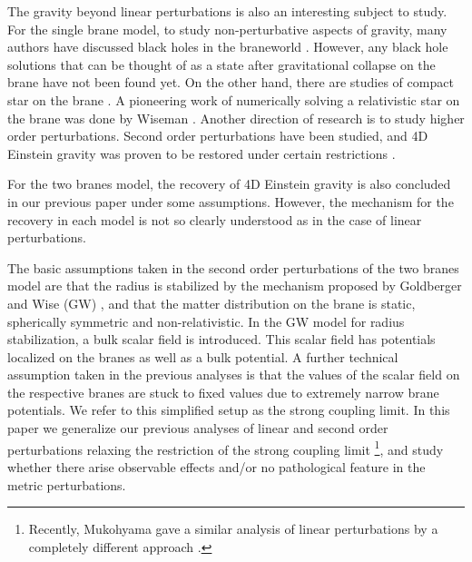 \documentclass[a4paper,showpacs,preprintnumbers,amsmath,amssymb]{revtex4}
\begin{document}
The gravity beyond linear perturbations is also an interesting subject to study. For the single brane model,
to study non-perturbative aspects of gravity, many authors have discussed black holes in the braneworld \cite{Gregory:1993vy,Chamblin:2000by,Emparan:2000wa,Dadhich:2000am,Giannakis:2001ss,Chamblin:2001ra,Bruni:2001fd,Horowitz:2001cz,Cadeau:2001tj,Vacaru:2001rf,Vacaru:2001wc,Emparan:2001wn,Kanti:2001cj,Casadio:2001jg,Tanaka:2002rb}.
However, any black hole solutions that can be thought of as a state after gravitational collapse on the brane have not been found yet. On the other hand, there are studies of compact star on the brane \cite{Germani:2001du,Deruelle:2001fb}.
A pioneering work of numerically solving a relativistic star on the brane was done by Wiseman \cite{Wiseman:2001xt}.  
Another direction of research is to study higher order perturbations. 
Second order perturbations have been studied, and 4D Einstein gravity was proven to be restored under certain restrictions \cite{Giannakis:2001zx,Kudoh:2001wb}.  


For the two branes model, the recovery of 4D Einstein gravity is also concluded in our previous paper 
\cite{Kudoh:2001kz} under some assumptions.
However, the mechanism for the recovery in each model is not so clearly understood as in the case of linear perturbations.  

The basic assumptions taken in the second order perturbations of the two branes model are that the radius is stabilized by the mechanism proposed by Goldberger and Wise (GW) \cite{Goldberger:1999uk}, and that the matter distribution on the brane is static, spherically symmetric and non-relativistic. 
In the GW model for radius stabilization, a bulk scalar field is introduced. This scalar field has potentials localized on the branes as well as a bulk potential. 
A further technical assumption taken in the previous analyses \cite{Tanaka:2000er,Kudoh:2001kz} is that the values of the scalar field 
on the respective branes are stuck to fixed values due to extremely narrow brane potentials.  
We refer to this simplified setup as the strong coupling limit.   
In this paper we generalize our previous analyses of linear and second order perturbations \cite{Kudoh:2001kz}  
relaxing the restriction of the strong coupling limit 
\footnote{Recently, Mukohyama gave a similar analysis of linear perturbations by a completely different approach \cite{Mukohyama:2001jv}.},
and study whether there arise observable effects and/or no pathological feature in the metric perturbations. 
\end{document}
